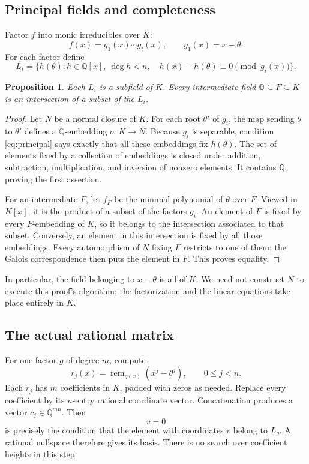 \documentclass[11pt,letterpaper]{article}
\newtheorem{proposition}[theorem]{Proposition}
\theoremstyle{definition}
\theoremstyle{remark}
\newcommand{\Q}{\mathbb Q}
\begin{document}
\subsection{Principal fields and completeness}
Factor \(f\) into monic irreducibles over \(K\):
\[
 f(x)=g_1(x)\cdots g_t(x),\qquad g_1(x)=x-\theta.
\]
For each factor define
\begin{equation}
 L_i=\{h(\theta):h\in\Q[x],\ \deg h<n,
             \quad h(x)-h(\theta)\equiv0\pmod{g_i(x)}\}.
 \label{eq:principal}
\end{equation}
\begin{proposition}\label{prop:principal}
Each \(L_i\) is a subfield of \(K\). Every intermediate field
\(\Q\subseteq F\subseteq K\) is an intersection of a subset of the \(L_i\).
\end{proposition}
\begin{proof}
Let \(N\) be a normal closure of \(K\). For each root \(\theta'\) of
\(g_i\), the map sending \(\theta\) to \(\theta'\) defines a
\(\Q\)-embedding \(\sigma:K\to N\). Because \(g_i\) is separable,
condition \eqref{eq:principal} says exactly that all these embeddings fix
\(h(\theta)\). The set of elements fixed by a collection of embeddings
is closed under addition, subtraction, multiplication, and inversion of
nonzero elements. It contains \(\Q\), proving the first assertion.

For an intermediate \(F\), let \(f_F\) be the minimal polynomial of
\(\theta\) over \(F\). Viewed in \(K[x]\), it is the product of a subset
of the factors \(g_i\). An element of \(F\) is fixed by every
\(F\)-embedding of \(K\), so it belongs to the intersection associated
to that subset. Conversely, an element in this intersection is fixed by all
those embeddings. Every automorphism of \(N\) fixing \(F\) restricts to
one of them; the Galois correspondence then puts the element in \(F\).
This proves equality.
\end{proof}
In particular, the field belonging to \(x-\theta\) is all of \(K\).
We need not construct \(N\) to execute this proof's algorithm: the
factorization and the linear equations take place entirely in \(K\).

\subsection{The actual rational matrix}
For one factor \(g\) of degree \(m\), compute
\[
 r_j(x)=\operatorname{rem}_{g(x)}(x^j-\theta^j),
 \qquad 0\leq j<n.
\]
Each \(r_j\) has \(m\) coefficients in \(K\), padded with zeros as
needed. Replace every coefficient by its \(n\)-entry rational coordinate
vector. Concatenation produces a vector \(c_j\in\Q^{mn}\). Then
\begin{equation}
 [\,c_0\ c_1\ \cdots\ c_{n-1}\,]v=0
 \label{eq:principalmatrix}
\end{equation}
is precisely the condition that the element with coordinates \(v\)
belong to \(L_g\). A rational nullspace therefore gives its basis.
There is no search over coefficient heights in this step.
\end{document}
